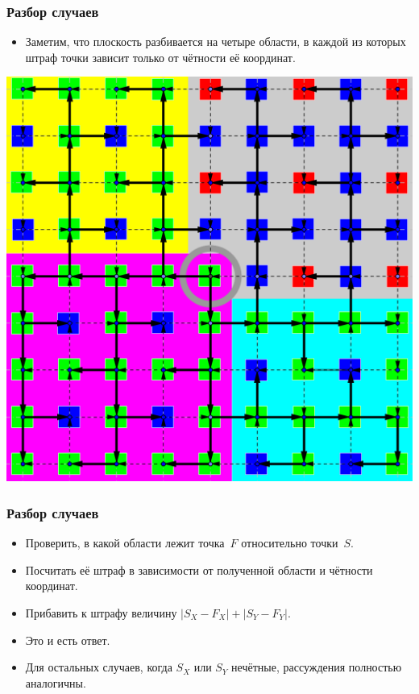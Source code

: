 \begin{frame}
    \frametitle{Разбор случаев}

    \begin{itemize}
        \item Заметим, что плоскость разбивается на четыре области, в каждой из которых штраф точки зависит только от чётности её координат.
    \end{itemize}
    \includegraphics[scale=0.6]{manhattan/pics/even_even_regions.png}
\end{frame}

\begin{frame}
    \frametitle{Разбор случаев}

    \begin{itemize}
        \item Проверить, в какой области лежит точка~$F$ относительно точки~$S$.
        \item Посчитать её штраф в зависимости от полученной области и чётности координат.
        \item Прибавить к штрафу величину $|S_X-F_X| + |S_Y-F_Y|$.
        \item Это и есть ответ.
        \item Для остальных случаев, когда $S_X$ или $S_Y$ нечётные, рассуждения полностью аналогичны.
    \end{itemize}
\end{frame}

